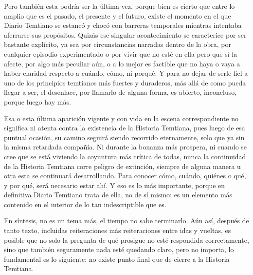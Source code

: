 \documentclass[
]{book}
\begin{document}
Pero también esta podría ser la última vez, porque bien es cierto que entre lo amplio que es el pasado, el presente y el futuro, existe el momento en el que Diario Temtiano se estancó y chocó con barreras temporales mientras intentaba aferrarse sus propósitos. Quizás ese singular acontecimiento se caracterice por ser bastante explícito, ya sea por circunstancias narradas dentro de la obra, por cualquier episodio experimentado o por vivir que no esté en ella pero que sí la afecte, por algo más peculiar aún, o a lo mejor es factible que no haya o vaya a haber claridad respecto a cuándo, cómo, ni porqué. Y para no dejar de serle fiel a uno de los principios temtianos más fuertes y duraderos, más allá de como pueda llegar a ser, el desenlace, por llamarlo de alguna forma, es abierto, inconcluso, porque luego hay más.

Esa o esta última aparición vigente y con vida en la escena correspondiente no significa ni atenta contra la existencia de la Historia Temtiana, pues luego de esa puntual ocasión, su camino seguirá siendo recorrido eternamente, solo que ya sin la misma retardada compañía. Ni durante la bonanza más prospera, ni cuando se cree que se está viviendo la coyuntura más crítica de todas, nunca la continuidad de la Historia Temtiana corre peligro de extinción, siempre de alguna manera u otra esta se continuará desarrollando. Para conocer cómo, cuándo, quiénes o qué, y por qué, será necesario estar ahí. Y eso es lo más importante, porque en definitiva Diario Temtiano trata de ella, no de sí mismo: es un elemento más contenido en el interior de lo tan indescriptible que es.

En síntesis, no es un tema más, el tiempo no sabe terminarlo. Aún así, después de tanto texto, incluidas reiteraciones más reiteraciones entre idas y vueltas, es posible que no solo la pregunta de qué prosigue no esté respondida correctamente, sino que también seguramente nada esté quedando claro, pero no importa, lo fundamental es lo siguiente: no existe punto final que de cierre a la Historia Temtiana.
\end{document}
